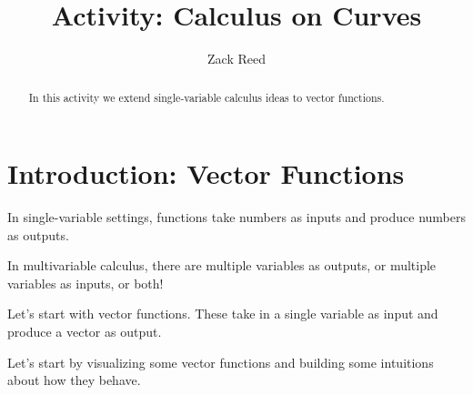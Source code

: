 \documentclass{ximera}
\title{Activity: Calculus on Curves}
\author{Zack Reed}
\begin{document}
\begin{abstract}
In this activity we extend single-variable calculus ideas to vector functions.
\end{abstract}
\maketitle

\section*{Introduction: Vector Functions}

In single-variable settings, functions take numbers as inputs and produce numbers as outputs. 

In multivariable calculus, there are multiple variables as outputs, or multiple variables as inputs, or both!

Let's start with vector functions. These take in a single variable as input and produce a vector as output.

Let's start by visualizing some vector functions and building some intuitions about how they behave.
\end{document}
